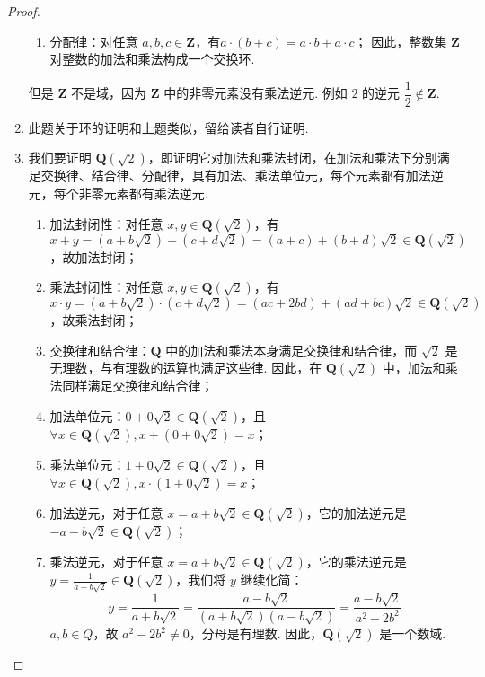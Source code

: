 \begin{proof}
\begin{enumerate}
\begin{enumerate}
        \item 分配律：对任意 $a, b, c \in \mathbf{Z}$，有$a \cdot (b + c) = a \cdot b + a \cdot c$；
        因此，整数集 $\mathbf{Z}$ 对整数的加法和乘法构成一个交换环.
    \end{enumerate}
    但是 $\mathbf{Z}$ 不是域，因为 $\mathbf{Z}$ 中的非零元素没有乘法逆元. 例如 $2$ 的逆元 $\dfrac{1}{2} \notin \mathbf{Z}$.
    \item 此题关于环的证明和上题类似，留给读者自行证明.
    \item 我们要证明 $\mathbf{Q}(\sqrt{2})$，即证明它对加法和乘法封闭，在加法和乘法下分别满足交换律、结合律、分配律，具有加法、乘法单位元，每个元素都有加法逆元，每个非零元素都有乘法逆元.
    \begin{enumerate}
        \item 加法封闭性：对任意 $x, y \in \mathbf{Q}(\sqrt{2})$，有$x + y = (a + b\sqrt{2}) + (c + d\sqrt{2}) = (a + c) + (b + d)\sqrt{2} \in \mathbf{Q}(\sqrt{2})$，故加法封闭；
        \item 乘法封闭性：对任意 $x, y \in \mathbf{Q}(\sqrt{2})$，有$x \cdot y = (a + b\sqrt{2}) \cdot (c + d\sqrt{2}) = (ac + 2bd) + (ad + bc)\sqrt{2} \in \mathbf{Q}(\sqrt{2})$，故乘法封闭；
        \item 交换律和结合律：$\mathbf{Q}$ 中的加法和乘法本身满足交换律和结合律，而 $\sqrt{2}$ 是无理数，与有理数的运算也满足这些律. 因此，在 $\mathbf{Q}(\sqrt{2})$ 中，加法和乘法同样满足交换律和结合律；
        \item 加法单位元：$0 + 0\sqrt{2} \in \mathbf{Q}(\sqrt{2})$，且 $\forall x \in \mathbf{Q}(\sqrt{2}), x + (0 + 0\sqrt{2}) = x$；
        \item 乘法单位元：$1 + 0\sqrt{2} \in \mathbf{Q}(\sqrt{2})$，且 $\forall x \in \mathbf{Q}(\sqrt{2}), x \cdot (1 + 0\sqrt{2}) = x$；
        \item 加法逆元，对于任意 $x = a + b\sqrt{2} \in \mathbf{Q}(\sqrt{2})$，它的加法逆元是 $-a - b\sqrt{2} \in \mathbf{Q}(\sqrt{2})$；
        \item 乘法逆元，对于任意 $x = a + b\sqrt{2} \in \mathbf{Q}(\sqrt{2})$，它的乘法逆元是 $y = \frac{1}{a + b\sqrt{2}} \in \mathbf{Q}(\sqrt{2})$，我们将 $y$ 继续化简：
        $$
        y = \frac{1}{a + b\sqrt{2}} = \frac{a - b\sqrt{2}}{(a + b\sqrt{2})(a - b\sqrt{2})} = \frac{a - b\sqrt{2}}{a^2 - 2b^2}
        $$
        $a,b \in Q$，故 $a^2 - 2b^2 \neq 0$，分母是有理数.
        因此，$\mathbf{Q}(\sqrt{2})$ 是一个数域.
    \end{enumerate}
\end{enumerate}
\end{proof}

